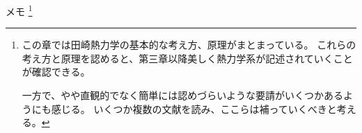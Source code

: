 メモ
\footnote{
  この章では田崎熱力学の基本的な考え方、原理がまとまっている。
  これらの考え方と原理を認めると、第三章以降美しく熱力学系が記述されていくことが確認できる。
  
  一方で、やや直観的でなく簡単には認めづらいような要請がいくつかあるようにも感じる。
  いくつか複数の文献を読み、ここらは補っていくべきと考える。
}
